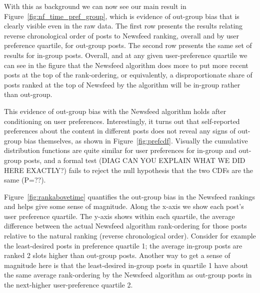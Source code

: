 \documentclass[12pt,letterpaper]{article}
\begin{document}
With this as background we can now see our main result in Figure~\ref{fig:nf_time_pref_group}, which is evidence of out-group bias that is clearly visible even in the raw data. The first row presents the results relating reverse chronological order of posts to Newsfeed ranking, overall and by user preference quartile, for out-group posts. The second row presents the same set of results for in-group posts. Overall, and at any given user-preference quartile we can see in the figure that the Newsfeed algorithm does more to put more recent posts at the top of the rank-ordering, or equivalently, a disproportionate share of posts ranked at the top of Newsfeed by the algorithm will be in-group rather than out-group.

This evidence of out-group bias with the Newsfeed algorithm holds after conditioning on user preferences. Interestingly, it turns out that self-reported preferences about the content in different posts does not reveal any signs of out-group bias themselves, as shown in Figure~\ref{fig:prefcdf}. Visually the cumulative distribution functions are quite similar for user preferences for in-group and out-group posts, and a formal test (DIAG CAN YOU EXPLAIN WHAT WE DID HERE EXACTLY?) fails to reject the null hypothesis that the two CDFs are the same (P=??).

Figure~\ref{fig:rankabovetime} quantifies the out-group bias in the Newsfeed rankings and helps give some sense of magnitude. Along the x-axis we show each post's user preference quartile. The y-axis shows within each quartile, the average difference between the actual Newsfeed algorithm rank-ordering for those posts relative to the natural ranking (reverse chronological order). Consider for example the least-desired posts in preference quartile 1; the average in-group posts are ranked 2 slots higher than out-group posts. Another way to get a sense of magnitude here is that the least-desired in-group posts in quartile 1 have about the same average rank-ordering by the Newsfeed algorithm as out-group posts in the next-higher user-preference quartile 2.
\end{document}
